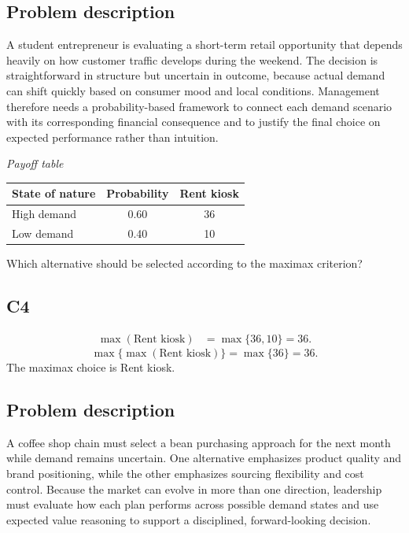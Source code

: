 

	
	\begin{ExamProblems}
		\item
		\subsection*{Problem description}
		A student entrepreneur is evaluating a short-term retail opportunity that depends heavily on how customer traffic develops during the weekend. The decision is straightforward in structure but uncertain in outcome, because actual demand can shift quickly based on consumer mood and local conditions. Management therefore needs a probability-based framework to connect each demand scenario with its corresponding financial consequence and to justify the final choice on expected performance rather than intuition.

		\begin{center}
			\textit{Payoff table} \par
			\begin{tabular}{l c c}
				\toprule
				State of nature & Probability & Rent kiosk \\
				\midrule
				High demand & 0.60 & 36 \\
				Low demand & 0.40 & 10 \\
				\bottomrule
			\end{tabular}
		\end{center}

		Which alternative should be selected according to the maximax criterion?

		\subsection*{C4}
		\[
		\begin{aligned}
		\max(\text{Rent kiosk}) &= \max\{36,10\} = 36.
		\end{aligned}
		\]
		\[
		\max\{\max(\text{Rent kiosk})\}
		= \max\{36\}
		= 36.
		\]
		The maximax choice is Rent kiosk.
		\item
		\subsection*{Problem description}
		A coffee shop chain must select a bean purchasing approach for the next month while demand remains uncertain. One alternative emphasizes product quality and brand positioning, while the other emphasizes sourcing flexibility and cost control. Because the market can evolve in more than one direction, leadership must evaluate how each plan performs across possible demand states and use expected value reasoning to support a disciplined, forward-looking decision.


\end{ExamProblems}
